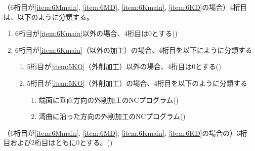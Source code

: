 （6桁目が\ref{item:6Mmain}, \ref{item:6MD}, \ref{item:6Kmain}, \ref{item:6KD}の場合）4桁目は、以下のように分類する。
\begin{enumerate}[label=\alph*), ref=\alph*)]
\item 6桁目が\ref{item:6Kmain}\hx 以外の場合、4桁目は0とする({})
\item 6桁目が\ref{item:6Kmain}（\Dimple 以外の加工）の場合、4桁目を以下にように分類する
  \begin{enumerate}[label=\alph{enumi}\,-\arabic*), leftmargin=\leftmargini]
  \item 5桁目が\ref{item:5KO}（外削加工）以外の場合、4桁目は0とする({})
  \item 5桁目が\ref{item:5KO}（外削加工）の場合、4桁目を以下のように分類する
    \begin{enumerate}[label=\arabic*., ref=\arabic*, start=0, leftmargin=*]
    \item 端面に垂直方向の外削加工のNCプログラム({})
    \item 湾曲に沿った方向の外削加工のNCプログラム({})
    \end{enumerate}
  \end{enumerate}
\end{enumerate}



（6桁目が\ref{item:6Mmain}, \ref{item:6MD}, \ref{item:6Kmain}, \ref{item:6KD}\hx の場合の）3桁目および2桁目はともに0とする。({})


